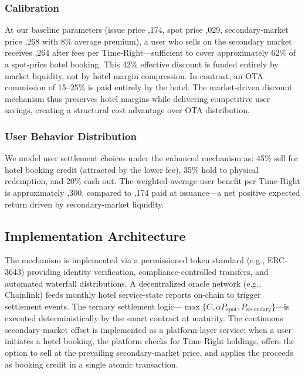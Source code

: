 \documentclass[12pt,a4paper]{article}
\begin{document}
\subsubsection{Calibration}

At our baseline parameters (issue price ,174, spot price ,029, secondary-market price ,268 with 8\% average premium), a user who sells on the secondary market receives ,264 after fees per Time-Right---sufficient to cover approximately 62\% of a spot-price hotel booking.
This 42\% effective discount is funded entirely by market liquidity, not by hotel margin compression.
In contrast, an OTA commission of 15--25\% is paid entirely by the hotel.
The market-driven discount mechanism thus preserves hotel margins while delivering competitive user savings, creating a structural cost advantage over OTA distribution.

\subsubsection{User Behavior Distribution}

We model user settlement choices under the enhanced mechanism as: 45\% sell for hotel booking credit (attracted by the lower fee), 35\% hold to physical redemption, and 20\% cash out.
The weighted-average user benefit per Time-Right is approximately ,300, compared to ,174 paid at issuance---a net positive expected return driven by secondary-market liquidity.

\subsection{Implementation Architecture}

The mechanism is implemented via a permissioned token standard (e.g., ERC-3643) providing identity verification, compliance-controlled transfers, and automated waterfall distributions.
A decentralized oracle network (e.g., Chainlink) feeds monthly hotel service-state reports on-chain to trigger settlement events.
The ternary settlement logic---$\max\{C, \alpha P_{\text{spot}}, P_{\text{secondary}}\}$---is executed deterministically by the smart contract at maturity.
The continuous secondary-market offset is implemented as a platform-layer service: when a user initiates a hotel booking, the platform checks for Time-Right holdings, offers the option to sell at the prevailing secondary-market price, and applies the proceeds as booking credit in a single atomic transaction.
\end{document}
